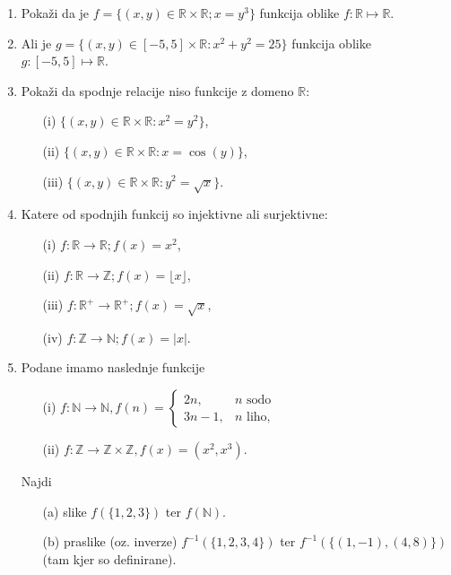 \documentclass[11pt,paper=b5,footinclude,headinclude]{scrbook} %
\begin{document}
\begin{enumerate}
(e) Ali je $g \circ f$ surjektivna?


\item Pokaži da je  $f=\{(x,y)\in \mathbb{R}\times \mathbb{R}; x= y^3\}$ funkcija oblike  $f:\mathbb{R}\mapsto \mathbb{R}$. 

\item Ali je $g= \{(x,y)\in [-5,5]\times \mathbb{R}: x^2 + y^2 = 25 \}$ funkcija oblike  $g:[-5,5]\mapsto \mathbb{R}$.
\item Pokaži da spodnje relacije niso funkcije z domeno $\mathbb{R}$:
\begin{enumerate}
\item[(i)] $\{(x,y)\in \mathbb{R}\times \mathbb{R}: x^2 = y^2 \}$,
\item[(ii)] $\{(x,y)\in \mathbb{R}\times \mathbb{R}: x = \cos(y) \}$,
\item[(iii)] $\{(x,y)\in \mathbb{R}\times \mathbb{R}: y^2 = \sqrt{x} \}$.
\end{enumerate}


\item Katere od spodnjih funkcij so injektivne ali surjektivne:
\begin{enumerate}
\item[(i)] $f\colon \mathbb{R} \to \mathbb{R}; f(x) = x^2$,
\item[(ii)] $f\colon \mathbb{R} \to \mathbb{Z}; f(x) =\lfloor x\rfloor$,
\item[(iii)] $f\colon \mathbb{R}^+ \to \mathbb{R}^+; f(x) =\sqrt{x}$,
\item[(iv)] $f\colon \mathbb{Z} \to \mathbb{N}; f(x) = |x|$.
\end{enumerate}
\item Podane imamo naslednje funkcije
\begin{enumerate}
\item[(i)] $f\colon \mathbb{N} \to \mathbb{N}, f(n) =    \begin{cases}
      2n,& n \textrm{ sodo } \\
      3n -1,& n \textrm{ liho},
    \end{cases}$
\item[(ii)] $f\colon \mathbb{Z}  \to \mathbb{Z}\times \mathbb{Z} , f(x) = (x^2, x^3)$.
\end{enumerate}
Najdi
\begin{enumerate}
\item[(a)]  slike $f(\{1,2,3\})$ ter $f(\mathbb{N})$.
\item[(b)]   praslike (oz. inverze) $f^{-1}(\{1,2,3,4\})$ ter $f^{-1}(\{(1,-1), (4,8)\})$ (tam kjer so definirane).
\end{enumerate}



\end{enumerate}
\end{document}
